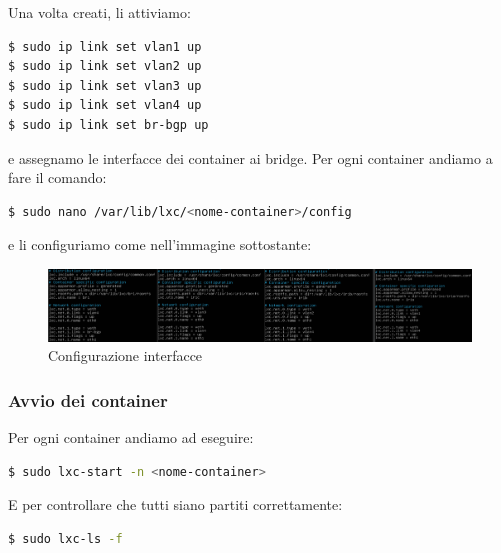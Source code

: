 \documentclass[12pt,a4paper,twoside]{book}
\begin{document}
Una volta creati, li attiviamo:
\begin{lstlisting}[language=bash]
$ sudo ip link set vlan1 up
$ sudo ip link set vlan2 up
$ sudo ip link set vlan3 up
$ sudo ip link set vlan4 up
$ sudo ip link set br-bgp up
\end{lstlisting}

e assegnamo le interfacce dei container ai bridge.
Per ogni container andiamo a fare il comando:
\begin{lstlisting}[language=bash]
$ sudo nano /var/lib/lxc/<nome-container>/config
\end{lstlisting}
e li configuriamo come nell'immagine sottostante:
\begin{figure}[H]
    \centering
    \includegraphics[width=1.0\linewidth]{tesi/img/configurazione_interfacce.png}
    \caption{Configurazione interfacce}
    \label{fig:configurazione_interfacce}
\end{figure}

\subsubsection{Avvio dei container}
Per ogni container andiamo ad eseguire:
\begin{lstlisting}[language=bash]
$ sudo lxc-start -n <nome-container>
\end{lstlisting}
E per controllare che tutti siano partiti correttamente:
\begin{lstlisting}[language=bash]
$ sudo lxc-ls -f
\end{lstlisting}
\end{document}
